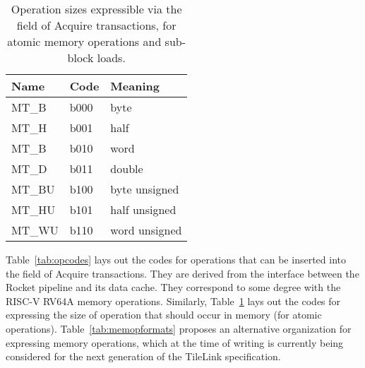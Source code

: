 \begin{table}
\centering
\begin{tabular}{|l|l|l|}
\hline
Name  & Code & Meaning \\ \hline \hline
MT\_B & b000 & byte \\ \hline
MT\_H & b001 & half \\ \hline
MT\_B & b010 & word \\ \hline
MT\_D & b011 & double \\ \hline
MT\_BU & b100 & byte unsigned \\ \hline
MT\_HU & b101 & half unsigned \\ \hline
MT\_WU & b110 & word unsigned \\ \hline
\end{tabular}
\caption{Operation sizes expressible via the  field of Acquire transactions,
for atomic memory operations and sub-block loads.}
\label{tab:opsizes}
\end{table}

Table~\ref{tab:opcodes} lays out the codes for operations
that can be inserted into the  field of Acquire transactions.
They are derived from the interface between the Rocket pipeline and its data cache.
They correspond to some degree with the RISC-V RV64A memory operations.
Similarly, Table~\ref{tab:opsizes} lays out the codes for expressing the size of operation
that should occur in memory (for atomic operations).
Table~\ref{tab:memopformats} proposes an alternative organization for expressing memory operations,
which at the time of writing is currently being considered
for the next generation of the TileLink specification.

